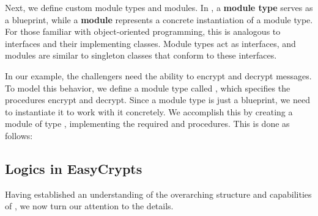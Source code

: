 \begin{enumerate}
	Next, we define custom module types and modules. In \EasyCrypt, a \textbf{module type} serves as a blueprint, while a \textbf{module} represents a concrete instantiation of a module type. For those familiar with object-oriented programming, this is analogous to interfaces and their implementing classes. Module types act as interfaces, and modules are similar to singleton classes that conform to these interfaces.

	In our example, the challengers need the ability to encrypt and decrypt messages. To model this behavior, we define a module type called , which specifies the procedures encrypt and decrypt. Since a module type is just a blueprint, we need to instantiate it to work with it concretely. We accomplish this by creating a module  of type , implementing the required  and  procedures. This is done as follows:\\
\end{enumerate}


\newpage
\subsection{Logics in EasyCrypts}
Having established an understanding of the overarching structure and capabilities of \EasyCrypt, we now turn our attention to the details.


